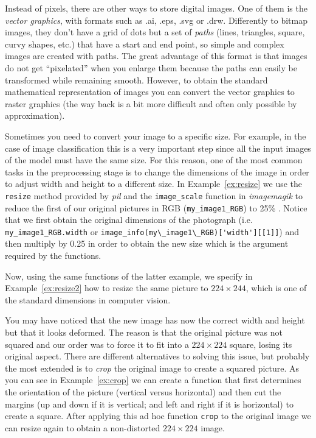 
Instead of pixels, there are other ways to store digital images. One of them is the \textit{vector graphics}, with formats such as .ai, .eps, .svg or .drw. Differently to bitmap images, they don't have a grid of dots but a set of \textit{paths} (lines, triangles, square, curvy shapes, etc.) that have a start and end point, so  simple and complex images are created with paths. The great advantage of this format is that images do not get  ``pixelated'' when you enlarge them because the paths can easily be transformed 	while remaining smooth. However, to obtain the standard mathematical representation of images you can convert the vector graphics to raster graphics (the way back is a bit more difficult and often only possible by approximation).

Sometimes you need to convert your image to a specific size. For example, in the case of image classification this is a very important step since all the input images of the model must have the same size. For this reason, one of the most common tasks in the preprocessing stage is to change the dimensions of the image in order to adjust width and height to a different size. In Example~\ref{ex:resize} we use the \texttt{resize} method provided by \emph{pil} and the \texttt{image\_scale} function in \emph{imagemagik} to reduce the first of our original pictures in RGB (\texttt{my\_image1\_RGB}) to 25\% . Notice that we first obtain the original dimensions of the photograph (i.e. \texttt{my\_image1\_RGB.width} or \verb|image_info(my\_image1\_RGB)['width'][[1]]|) and then multiply by 0.25 in order to obtain the new size which is the argument required by the functions.


Now, using the same functions of the latter example, we specify in Example~\ref{ex:resize2} how to resize the same picture to $224 \times 244$, which is one of the standard dimensions in computer vision.


You may have noticed that the new image has now the correct width and height but that it looks deformed. The reason is that the original picture was not squared and our order was to force it to fit  into a $224 \times 224$ square, losing its original aspect. There are different alternatives to solving this issue, but probably the most extended is to \textit{crop} the original image to create a squared picture. As you can see in Example~\ref{ex:crop} we can create a function that first determines the orientation of the picture (vertical versus horizontal) and then cut the margins  (up and down if it is vertical; and left and right if it is horizontal) to create a square. After applying this ad hoc function \texttt{crop} to the original image we can resize again to obtain a non-distorted $224 \times 224$ image.

